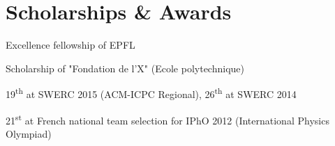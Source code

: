 \documentclass[a4paper,10pt]{article} %
\begin{document}
\section{Scholarships \& Awards}

\begin{dinglist}{67} \itemsep -4pt
\item Excellence fellowship of EPFL
\item Scholarship of "Fondation de l’X" (Ecole polytechnique)
\item 19\textsuperscript{th} at SWERC 2015 (ACM-ICPC Regional), 26\textsuperscript{th} at SWERC 2014
\item 21\textsuperscript{st} at French national team selection for IPhO 2012 (International Physics Olympiad) 
\end{dinglist}






\end{document}
